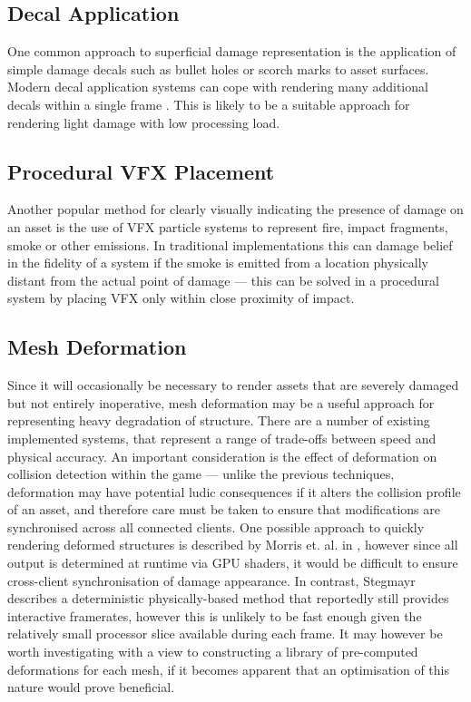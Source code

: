 \documentclass[11pt]{report}
\begin{document}
		\subsection{Decal Application}
			One common approach to superficial damage representation is the application of simple damage decals such as bullet holes or scorch marks to asset surfaces. Modern decal application systems can cope with rendering many additional decals within a single frame \cite{jing2006post}. This is likely to be a suitable approach for rendering light damage with low processing load.

		\subsection{Procedural VFX Placement}
			Another popular method for clearly visually indicating the presence of damage on an asset is the use of VFX particle systems to represent fire, impact fragments, smoke or other emissions. In traditional implementations this can damage belief in the fidelity of a system if the smoke is emitted from a location physically distant from the actual point of damage --- this can be solved in a procedural system by placing VFX only within close proximity of impact.

		\subsection{Mesh Deformation}
			Since it will occasionally be necessary to render assets that are severely damaged but not entirely inoperative, mesh deformation may be a useful approach for representing heavy degradation of structure. There are a number of existing implemented systems, that represent a range of trade-offs between speed and physical accuracy. An important consideration is the effect of deformation on collision detection within the game --- unlike the previous techniques, deformation may have potential ludic consequences if it alters the collision profile of an asset, and therefore care must be taken to ensure that modifications are synchronised across all connected clients.
			One possible approach to quickly rendering deformed structures is described by Morris et. al. in \cite{morris2012modular}, however since all output is determined at runtime via GPU shaders, it would be difficult to ensure cross-client synchronisation of damage appearance. In contrast, Stegmayr \cite{stegmayr2008procedural} describes a deterministic physically-based method that reportedly still provides interactive framerates, however this is unlikely to be fast enough given the relatively small processor slice available during each frame. It may however be worth investigating with a view to constructing a library of pre-computed deformations for each mesh, if it becomes apparent that an optimisation of this nature would prove beneficial.
\end{document}
